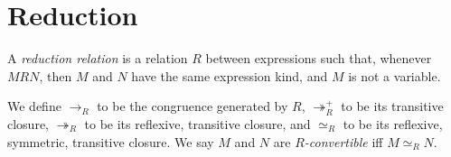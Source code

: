 
\section{Reduction}

A \emph{reduction relation} is a relation $R$ between expressions such that, whenever $M R N$, then $M$ and $N$ have the same expression kind,
and $M$ is not a variable.

\begin{code}%
\>  \AgdaSymbol{(} \AgdaSymbol{:} \AgdaSymbol{)} \AgdaSymbol{(} \AgdaSymbol{:}  \AgdaSymbol{)} \<%
\end{code}


We define $\rightarrow_R$ to be the
congruence generated by $R$, $\twoheadrightarrow^+_R$ to be its transitive closure, $\twoheadrightarrow_R$ to be its reflexive, transitive closure, and $\simeq_R$ to be its reflexive, symmetric, transitive closure.
  We say $M$ and $N$ are \emph{$R$-convertible} iff $M \simeq_R N$.

